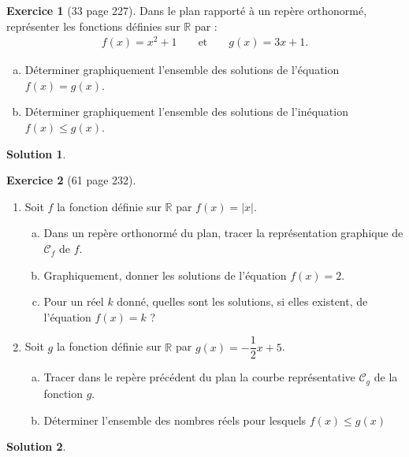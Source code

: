 \documentclass[a4paper, 14pt]{extarticle}
\theoremstyle{plain}
\newtheorem*{sol}{Solution}
\theoremstyle{definition}
\newtheorem{ex}{Exercice}
\newcommand{\C}{\mathcal{C}}
\newcommand{\R}{\mathbb{R}}
\newif\ifsolutions
\newcommand{\exe}[2]{
		\begin{ex} #1  \end{ex}
		\begin{sol} #2 \end{sol}
	}
\newcommand{\exe}[2]{
		\begin{ex} #1  \end{ex}
	}
\begin{document}
\pagestyle{fancy}
\fancyhead[C]{\textbf{Exercices 33 et 61 pages 227-232 \ifsolutions -- Solutions  \fi}}
\fancyhead[R]{\today}

\exe{[33 page 227]
	Dans le plan rapporté à un repère orthonormé, représenter les fonctions définies sur $\R$ par :
		\begin{align*}
			f(x) = x^2 + 1 && \text{ et } && g(x)=3x+1.
		\end{align*}
	\begin{enumerate}[a)]
		\item Déterminer graphiquement l'ensemble des solutions de l'équation $f(x) = g(x)$.
		\item Déterminer graphiquement l'ensemble des solutions de l'inéquation $f(x) \leq g(x)$.
	\end{enumerate}
}{}

\begin{center}
\end{center}

\newpage 
\exe{[61 page 232]
	\begin{enumerate}
		\item 
		Soit $f$ la fonction définie sur $\R$ par $f(x) = |x|$.
		\begin{enumerate}[a)]
			\item
			Dans un repère orthonormé du plan, tracer la représentation graphique de $\C_f$ de $f$.
			\item
			Graphiquement, donner les solutions de l'équation $f(x) = 2$.
			\item
			Pour un réel $k$ donné, quelles sont les solutions, si elles existent, de l'équation $f(x) = k$ ?
		\end{enumerate}
		\item 
		Soit $g$ la fonction définie sur $\R$ par $g(x) = -\dfrac12 x + 5$.
		\begin{enumerate}[a)]
			\item
			Tracer dans le repère précédent du plan la courbe représentative $\C_g$ de la fonction $g$.
			\item
			Déterminer l'ensemble des nombres réels pour lesquels $f(x) \leq g(x)$
		\end{enumerate}
	\end{enumerate}
}{}
\end{document}
